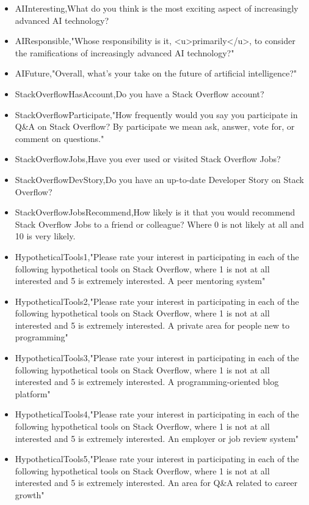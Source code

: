 \begin{appendices}
\begin{itemize}
        \item AIInteresting,What do you think is the most exciting aspect of increasingly advanced AI technology?
        \item AIResponsible,"Whose responsibility is it, <u>primarily</u>, to consider the ramifications of increasingly advanced AI technology?"
        \item AIFuture,"Overall, what's your take on the future of artificial intelligence?"
        \item StackOverflowHasAccount,Do you have a Stack Overflow account?
        \item StackOverflowParticipate,"How frequently would you say you participate in Q&A on Stack Overflow? By participate we mean ask, answer, vote for, or comment on questions."
        \item StackOverflowJobs,Have you ever used or visited Stack Overflow Jobs?
        \item StackOverflowDevStory,Do you have an up-to-date Developer Story on Stack Overflow?
        \item StackOverflowJobsRecommend,How likely is it that you would recommend Stack Overflow Jobs to a friend or colleague? Where 0 is not likely at all and 10 is very likely.
        \item HypotheticalTools1,"Please rate your interest in participating in each of the following hypothetical tools on Stack Overflow, where 1 is not at all interested and 5 is extremely interested. A peer mentoring system"
        \item HypotheticalTools2,"Please rate your interest in participating in each of the following hypothetical tools on Stack Overflow, where 1 is not at all interested and 5 is extremely interested. A private area for people new to programming"
        \item HypotheticalTools3,"Please rate your interest in participating in each of the following hypothetical tools on Stack Overflow, where 1 is not at all interested and 5 is extremely interested. A programming-oriented blog platform"
        \item HypotheticalTools4,"Please rate your interest in participating in each of the following hypothetical tools on Stack Overflow, where 1 is not at all interested and 5 is extremely interested. An employer or job review system"
        \item HypotheticalTools5,"Please rate your interest in participating in each of the following hypothetical tools on Stack Overflow, where 1 is not at all interested and 5 is extremely interested. An area for Q&A related to career growth"

\end{itemize}
\end{appendices}
